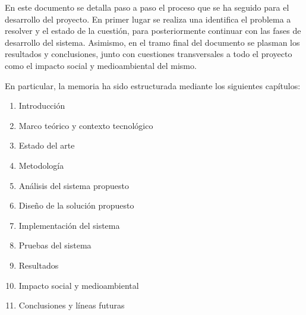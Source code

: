     En este documento se detalla paso a paso el proceso que se ha seguido para el desarrollo del proyecto. En primer lugar se realiza una identifica el problema a resolver y el estado de la cuestión, para posteriormente continuar con las fases de desarrollo del sistema. Asimismo, en el tramo final del documento se plasman los resultados y conclusiones, junto con cuestiones transversales a todo el proyecto como el impacto social y medioambiental del mismo.
    
    
    En particular, la memoria ha sido estructurada mediante los siguientes capítulos:
    \begin{enumerate}
        \item Introducción
        \item Marco teórico y contexto tecnológico
        \item Estado del arte
        \item Metodología 
        \item Análisis del sistema propuesto
        \item Diseño de la solución propuesto
        \item Implementación del sistema
        \item Pruebas del sistema
        \item Resultados
        \item Impacto social y medioambiental
        \item Conclusiones y líneas futuras
    \end{enumerate}
